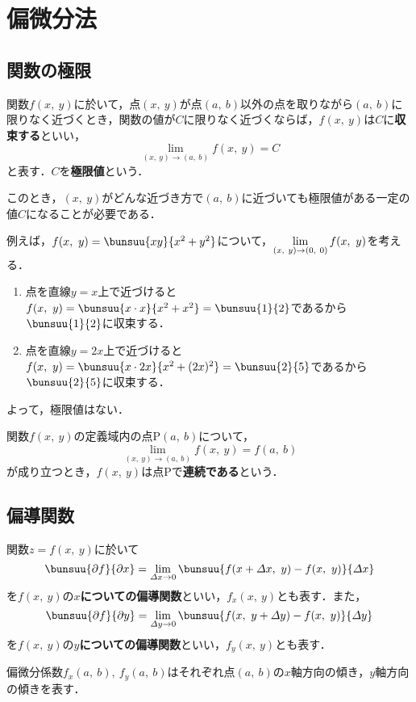 \chapter{偏微分法}
\setcounter{page}{1}
\section{関数の極限}

関数$f(x,\ y)$に於いて，点$(x,\ y)$が点$(a,\ b)$以外の点を取りながら$(a,\ b)$に限りなく近づくとき，関数の値が$C$に限りなく近づくならば，$f(x,\ y)$は$C$に\textbf{収束する}といい，
\begin{equation}
	\lim_{(x,\ y) \to (a,\ b)} f(x,\ y) = C
\end{equation}
と表す．$C$を\textbf{極限値}という．

このとき，$(x,\ y)$がどんな近づき方で$(a,\ b)$に近づいても極限値がある一定の値$C$になることが必要である．

例えば，$f(x,\ y) = \bunsuu{xy}{x^2 + y^2}$について，$\dlim_{(x,\ y) \to (0,\ 0)} f(x,\ y)$を考える．
\begin{enumerate}[label=(\roman*), labelsep=10pt, leftmargin=23pt]
	\item 点を直線$y = x$上で近づけると$f(x,\ y) = \bunsuu{x \cdot x}{x^2 + x^2} = \bunsuu{1}{2}$であるから$\bunsuu{1}{2}$に収束する．
	\item 点を直線$y = 2x$上で近づけると$f(x,\ y) = \bunsuu{x \cdot 2x}{x^2 + (2x)^2} = \bunsuu{2}{5}$であるから$\bunsuu{2}{5}$に収束する．
\end{enumerate}
よって，極限値はない．

関数$f(x,\ y)$の定義域内の点$\mathrm{P}(a,\ b)$について，
\begin{equation}
	\lim_{(x,\ y) \to (a,\ b)} f(x,\ y) = f(a,\ b)
\end{equation}
が成り立つとき，$f(x,\ y)$は点$\mathrm{P}$で\textbf{連続である}という．


\section{偏導関数}

関数$z = f(x,\ y)$に於いて
\begin{equation}
	\bunsuu{\partial f}{\partial x} = \lim_{\varDelta x \to 0} \bunsuu{f(x + \varDelta x,\ y) - f(x,\ y)}{\varDelta x}
\end{equation}
を$f(x,\ y)$の\textbf{$x$についての偏導関数}といい，$f_x(x,\ y)$とも表す．また，
\begin{equation}
	\bunsuu{\partial f}{\partial y} = \lim_{\varDelta y \to 0} \bunsuu{f(x,\ y + \varDelta y) - f(x,\ y)}{\varDelta y}
\end{equation}
を$f(x,\ y)$の\textbf{$y$についての偏導関数}といい，$f_y(x,\ y)$とも表す．

偏微分係数$f_x(a,\ b),\ f_y(a,\ b)$はそれぞれ点$(a,\ b)$の$x$軸方向の傾き，$y$軸方向の傾きを表す．

